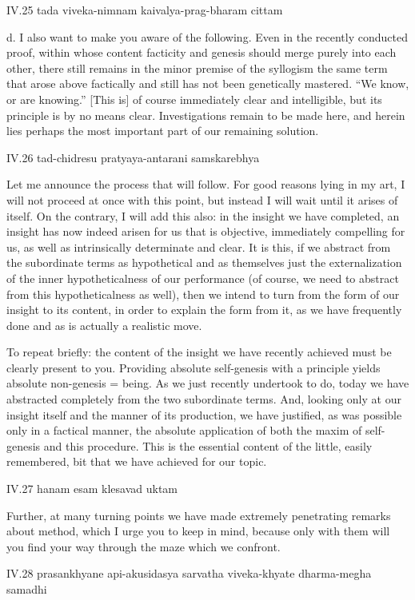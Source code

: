 IV.25
tada viveka-nimnam kaivalya-prag-bharam cittam

d. I also want to make you aware of the following.
Even in the recently conducted proof,
within whose content facticity and genesis should merge
purely into each other,
there still remains in the minor premise of the syllogism
the same term that arose above factically
and still has not been genetically mastered.
“We know, or are knowing.”
[This is] of course immediately clear and intelligible,
but its principle is by no means clear.
Investigations remain to be made here,
and herein lies perhaps the most important
part of our remaining solution.

IV.26
tad-chidresu pratyaya-antarani samskarebhya

Let me announce the process that will follow.
For good reasons lying in my art,
I will not proceed at once with this point,
but instead I will wait until it arises of itself.
On the contrary, I will add this also:
in the insight we have completed,
an insight has now indeed arisen for us
that is objective, immediately compelling for us,
as well as intrinsically determinate and clear.
It is this, if we abstract from the subordinate terms
as hypothetical and as themselves just the externalization of
the inner hypotheticalness of our performance
(of course, we need to abstract from this hypotheticalness as well),
then we intend to turn from the form of our insight
to its content, in order to explain the form from it,
as we have frequently done and as is actually a realistic move.

To repeat briefly:
the content of the insight we have recently achieved
must be clearly present to you.
Providing absolute self-genesis with a principle
yields absolute non-genesis = being.
As we just recently undertook to do,
today we have abstracted completely
from the two subordinate terms.
And, looking only at our insight itself
and the manner of its production, we have justified,
as was possible only in a factical manner,
the absolute application of both
the maxim of self-genesis and this procedure.
This is the essential content of the little, easily remembered,
bit that we have achieved for our topic.

IV.27
hanam esam klesavad uktam

Further, at many turning points we have made
extremely penetrating remarks about method,
which I urge you to keep in mind,
because only with them will you find
your way through the maze which we confront.

IV.28
prasankhyane api-akusidasya sarvatha viveka-khyate dharma-megha samadhi

